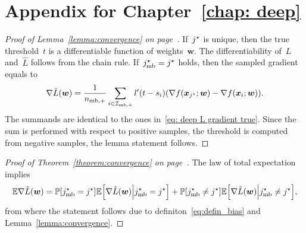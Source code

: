 \chapter{Appendix for Chapter~\ref{chap: deep}}

\lemmacovergencedeep*
\begin{proof}[Proof of Lemma~\ref{lemma:convergence} on page~\pageref{lemma:convergence}]
  If~$j^{\star}$ is unique, then the true threshold~$t$ is a differentiable function of weights~$\bm{w}$. The differentiability of~$L$ and~$\hat{L}$ follows from the chain rule. If~$j^{\star}_{\text{mb}} = j^{\star}$ holds, then the sampled gradient equals to
  \begin{equation}\label{eq:grad_min_aux}
    \nabla \hat L(\bm{w})
      = \frac{1}{\nmbpos} \sum_{i\in \Imbpos} l'(t - s_i) \Brac{\nabla f(\bm{x}_{\indmax}; \bm{w}) - \nabla f(\bm{x}_i; \bm{w})}.
  \end{equation}
  The summands are identical to the ones in~\eqref{eq: deep L gradient true}. Since the sum is performed with respect to positive samples, the threshold is computed from negative samples, the lemma statement follows.
\end{proof}

\thmcovergencedeep*
\begin{proof}[Proof of Theorem~\ref{theorem:convergence} on page~\pageref{theorem:convergence}]
  The law of total expectation implies
  \begin{equation*}
    \EE \nabla \hat L(\bm{w})
      = \PP \Brac[s]{\indmaxmb = \indmax} \EE \Brac[s]{\nabla \hat L(\bm{w}) \middle\vert \indmaxmb =\indmax}
      + \PP \Brac[s]{\indmaxmb \neq \indmax} \EE \Brac[s]{\nabla \hat L(\bm{w}) \middle\vert\indmaxmb\neq \indmax},
  \end{equation*}
  from where the statement follows due to definiton~\eqref{eq:defin_bias} and Lemma~\ref{lemma:convergence}.
\end{proof}
